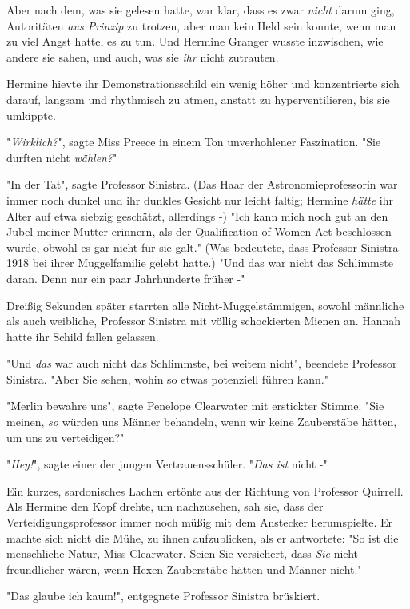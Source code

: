 {Aber nach dem, was sie gelesen hatte, war klar, dass es zwar \emph{nicht} darum ging, Autoritäten \emph{aus Prinzip} zu trotzen, aber man kein Held sein konnte, wenn man zu viel Angst hatte, es zu tun. Und Hermine Granger wusste inzwischen, wie andere sie sahen, und auch, was sie \emph{ihr} nicht zutrauten.

Hermine hievte ihr Demonstrationsschild ein wenig höher und konzentrierte sich darauf, langsam und rhythmisch zu atmen, anstatt zu hyperventilieren, bis sie umkippte.

"\emph{Wirklich?}", sagte Miss Preece in einem Ton unverhohlener Faszination. "Sie durften nicht \emph{wählen?}"

"In der Tat", sagte Professor Sinistra. (Das Haar der Astronomieprofessorin war immer noch dunkel und ihr dunkles Gesicht nur leicht faltig; Hermine \emph{hätte} ihr Alter auf etwa siebzig geschätzt, allerdings -) "Ich kann mich noch gut an den Jubel meiner Mutter erinnern, als der Qualification of Women Act beschlossen wurde, obwohl es gar nicht für sie galt." (Was bedeutete, dass Professor Sinistra 1918 bei ihrer Muggelfamilie gelebt hatte.) "Und das war nicht das Schlimmste daran. Denn nur ein paar Jahrhunderte früher -"

Dreißig Sekunden später starrten alle Nicht-Muggelstämmigen, sowohl männliche als auch weibliche, Professor Sinistra mit völlig schockierten Mienen an. Hannah hatte ihr Schild fallen gelassen.

"Und \emph{das} war auch nicht das Schlimmste, bei weitem nicht", beendete Professor Sinistra. "Aber Sie sehen, wohin so etwas potenziell führen kann."

"Merlin bewahre uns", sagte Penelope Clearwater mit erstickter Stimme. "Sie meinen, \emph{so} würden uns Männer behandeln, wenn wir keine Zauberstäbe hätten, um uns zu verteidigen?"

"\emph{Hey!}", sagte einer der jungen Vertrauensschüler. "\emph{Das ist} nicht -"

Ein kurzes, sardonisches Lachen ertönte aus der Richtung von Professor Quirrell. Als Hermine den Kopf drehte, um nachzusehen, sah sie, dass der Verteidigungsprofessor immer noch müßig mit dem Anstecker herumspielte. Er machte sich nicht die Mühe, zu ihnen aufzublicken, als er antwortete: "So ist die menschliche Natur, Miss Clearwater. Seien Sie versichert, dass \emph{Sie} nicht freundlicher wären, wenn Hexen Zauberstäbe hätten und Männer nicht."

"Das glaube ich kaum!", entgegnete Professor Sinistra brüskiert.

}
